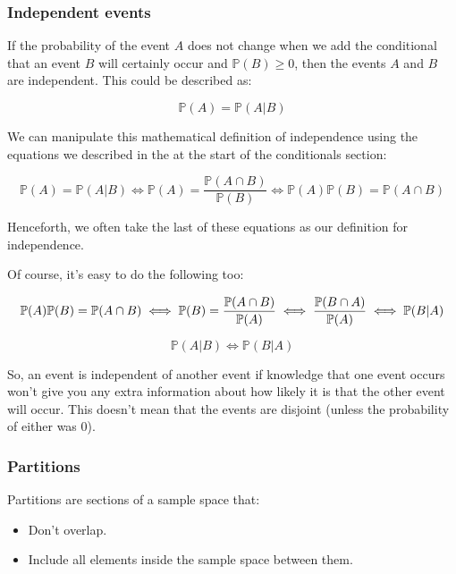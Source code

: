 \subsubsection{Independent events}

If the probability of the event $A$ does not change when we add the conditional
that an event $B$ will certainly occur and $\mathbb{P}(B) \ge 0$, then the
events $A$ and $B$ are independent. This could be described as:

\begin{dmath*}
	{\mathbb{P}(A) = \mathbb{P}(A|B)}
\end{dmath*}

We can manipulate this mathematical definition of independence using the
equations we described in the at the start of the conditionals section:

\begin{dmath*}
	{\mathbb{P}(A) = \mathbb{P}(A|B)} \iff {\mathbb{P}(A) = \frac{\mathbb{P}(A \cap B)}{\mathbb{P}(B)}} \iff {\mathbb{P}(A)\mathbb{P}(B) = \mathbb{P}(A \cap B)}
\end{dmath*}

Henceforth, we often take the last of these equations as our definition for
independence.

Of course, it's easy to do the following too:

\begin{dmath*}
	{\mathbb{P}(A)\mathbb{P}(B) = \mathbb{P}(A \cap B)} \iff {\mathbb{P}(B) = \frac{\mathbb{P}(A \cap B)}{\mathbb{P}(A)}} \iff {\frac{\mathbb{P}(B \cap A)}{\mathbb{P}(A)}} \iff {\mathbb{P}(B|A)}\\	
\end{dmath*}

\begin{dmath*}
	{\mathbb{P}(A|B) \iff \mathbb{P}(B|A)}
\end{dmath*}

So, an event is independent of another event if knowledge that one event occurs
won't give you any extra information about how likely it is that the other event
will occur. This doesn't mean that the events are disjoint (unless the
probability of either was $0$).

\subsubsection{Partitions}

Partitions are sections of a sample space that:

\begin{itemize}
	\item Don't overlap.
	\item Include all elements inside the sample space between them.
\end{itemize}

